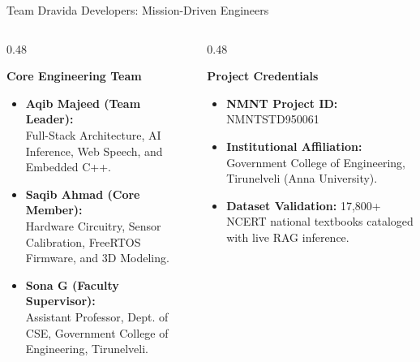 \documentclass[aspectratio=169,10pt]{beamer}
\begin{document}
\begin{frame}{Team Dravida Developers: Mission-Driven Engineers}
    \begin{columns}[T]
        \begin{column}{0.48\textwidth}
            \begin{block}{\textbf{Core Engineering Team}}
                \begin{itemize}
                    \item \textbf{Aqib Majeed (Team Leader):}\\Full-Stack Architecture, AI Inference, Web Speech, and Embedded C++.
                    \item \textbf{Saqib Ahmad (Core Member):}\\Hardware Circuitry, Sensor Calibration, FreeRTOS Firmware, and 3D Modeling.
                    \item \textbf{Sona G (Faculty Supervisor):}\\Assistant Professor, Dept. of CSE, Government College of Engineering, Tirunelveli.
                \end{itemize}
            \end{block}
        \end{column}
        \begin{column}{0.48\textwidth}
            \begin{block}{\textbf{Project Credentials}}
                \begin{itemize}
                    \item \textbf{NMNT Project ID:} NMNTSTD950061
                    \item \textbf{Institutional Affiliation:} Government College of Engineering, Tirunelveli (Anna University).
                    \item \textbf{Dataset Validation:} 17,800+ NCERT national textbooks cataloged with live RAG inference.
                \end{itemize}
            \end{block}
        \end{column}
    \end{columns}
\end{frame}
\end{document}
